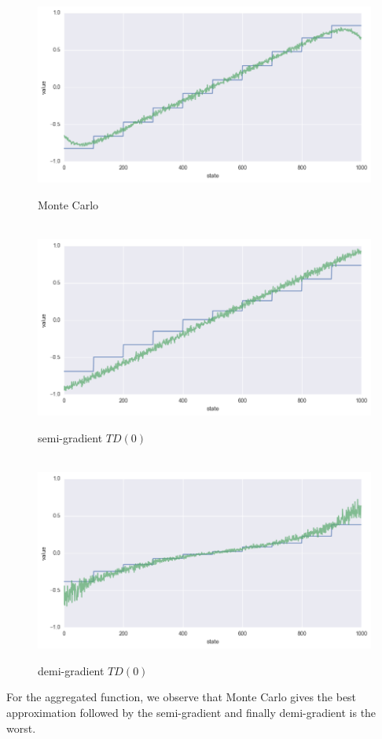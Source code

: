 \documentclass{article}
\begin{document}
    \begin{figure}
        \centering
        \includegraphics[width=\textwidth]{monte_carlo}
        \caption{Monte Carlo}
        ~
        \includegraphics[width=\textwidth]{semi_gradient}
        \caption{semi-gradient $TD(0)$}
        ~
        \includegraphics[width=\textwidth]{demi_gradient}
        \caption{demi-gradient $TD(0)$}
        \label{fig:expt2}
    \end{figure}

    For the aggregated function, we observe that Monte Carlo gives the best approximation followed by the semi-gradient and finally demi-gradient is the worst.
\end{document}
